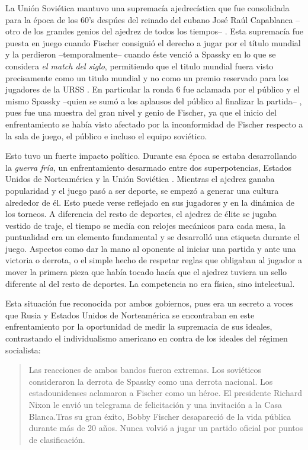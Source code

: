 \documentclass[twoside,openright,12pt,a4paper,spanish]{book}
\begin{document}
La Uni\'on Sovi\'etica mantuvo una supremac\'ia ajedrec\'istica que fue consolidada para la \'epoca de los 60's desp\'ues del reinado del cubano José Raúl Capablanca --otro de los grandes genios del ajedrez de todos los tiempos-- . Esta supremac\'ia fue puesta en juego cuando Fischer consigui\'o el derecho a jugar por el t\'itulo mundial y la perdieron --temporalmente-- cuando \'este venci\'o a Spassky en lo que se considera \emph{el match del siglo}, permitiendo que el titulo mundial fuera visto precisamente como un titulo mundial y no como un premio reservado para los jugadores de la URSS \cite[228]{golombek1976history}. En particular la ronda 6 fue aclamada por el p\'ublico y el mismo Spassky --quien se sum\'o a los aplausos del p\'ublico al finalizar la partida-- \cite[p. 225]{golombek1976history}, pues fue una muestra del gran nivel y genio de Fischer, ya que el inicio del enfrentamiento se hab\'ia visto afectado por la inconformidad de Fischer respecto a la sala de juego, el p\'ublico e incluso el equipo sovi\'etico.

Esto tuvo un fuerte impacto pol\'itico. Durante esa \'epoca se estaba desarrollando la \emph{guerra fr\'ia}, un enfrentamiento desarmado entre dos superpotencias, Estados Unidos de Norteam\'erica y la Uni\'on Sovi\'etica \cite[p. ix]{mason2002cold}. Mientras el ajedrez ganaba popularidad y el juego pas\'o a ser deporte, se empez\'o a generar una cultura alrededor de \'el. Esto puede verse reflejado en sus jugadores y en la din\'amica de los torneos. A diferencia del resto de deportes, el ajedrez de \'elite se jugaba vestido de traje, el tiempo se med\'ia con relojes mec\'anicos para cada mesa, la puntualidad era un elemento fundamental y se desarroll\'o una etiqueta durante el juego. Aspectos como dar la mano al oponente al iniciar una partida y ante una victoria o derrota, o el simple hecho de respetar reglas que obligaban al jugador a mover la primera pieza que hab\'ia tocado hac\'ia que el ajedrez tuviera un sello diferente al del resto de deportes. La competencia no era f\'isica, sino intelectual.

Esta situaci\'on fue reconocida por ambos gobiernos, pues era un secreto a voces que Rusia y Estados Unidos de Norteam\'erica se encontraban en este enfrentamiento por la oportunidad de medir la supremacia de sus ideales, contrastando el individualismo americano en contra de los ideales del r\'egimen socialista:

\begin{quote} \singlespace
    Las reacciones de ambos bandos fueron extremas. Los soviéticos consideraron la derrota de Spassky como una derrota nacional. Los estadounidenses aclamaron a Fischer como un héroe. El presidente Richard Nixon le envió un telegrama de felicitación y una invitación a la Casa Blanca.Tras su gran éxito, Bobby Fischer desapareció de la vida pública durante más de 20 años. Nunca volvió a jugar un partido oficial por puntos de clasificación. \cite{guerrafria_fischerspassky}
\end{quote}
\end{document}
